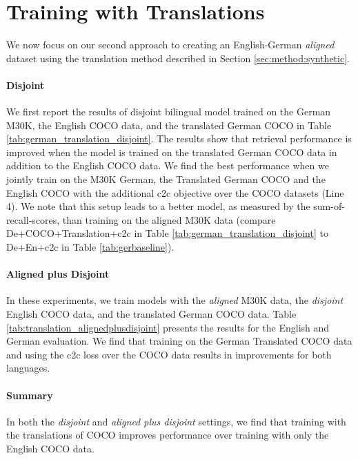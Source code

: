 \section{Training with Translations}\label{sec:transaltion}

We now focus on our second approach to creating an 
English-German \textit{aligned} dataset 
using the translation method described in Section \ref{sec:method:synthetic}.

\paragraph{Disjoint}

We first report the results of disjoint bilingual
model trained on the German M30K, the English COCO data, 
and the translated German COCO in Table \ref{tab:german_translation_disjoint}. 
The results show that retrieval performance is improved when the model is trained on the translated German 
COCO data in addition to the English COCO data. 
We find the best performance when we jointly train on the 
M30K German, the Translated German COCO and 
the English COCO with the additional c2c objective 
over the COCO datasets (Line 4). 
We note that this setup leads to a better model, as measured by the sum-of-recall-scores, than training on the aligned M30K data (compare De+COCO+Translation+c2c in Table \ref{tab:german_translation_disjoint} to De+En+c2c in Table \ref{tab:gerbaseline}).

\paragraph{Aligned plus Disjoint}

In these experiments, we train models with the {\it aligned} M30K  
data, the {\it disjoint} English COCO data, and the translated German COCO data. 
Table \ref{tab:translation_alignedplusdisjoint} 
presents the results for the English and German evaluation. 
We find that training on the German Translated COCO data and 
using the c2c loss over the COCO data results in improvements for both languages. 


\paragraph{Summary}

In both the \emph{disjoint} and 
\emph{aligned plus disjoint} settings, we find that training 
with the translations of COCO improves 
performance over training with only the English COCO data. 
